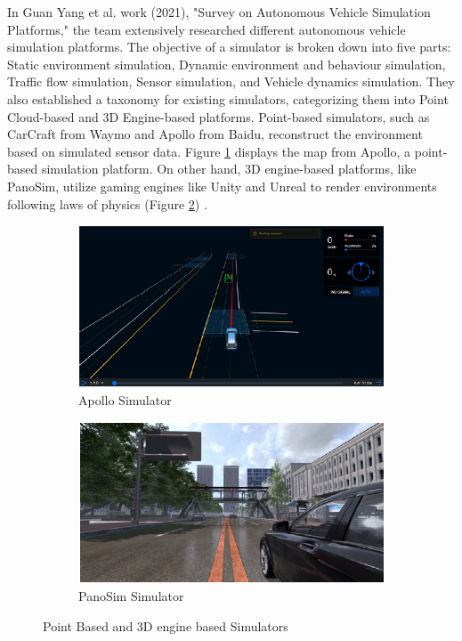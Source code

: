 \documentclass[12pt,twoside,a4paper,parskip]{scrbook} %
\begin{document}
In Guan Yang et al. work (2021), "Survey on Autonomous Vehicle Simulation Platforms," \cite{yangsurvey} the team extensively researched different autonomous vehicle simulation platforms. The objective of a simulator is broken down into five parts: Static environment simulation, Dynamic environment and behaviour simulation, Traffic flow simulation, Sensor simulation, and Vehicle dynamics simulation. They also established a taxonomy for existing simulators, categorizing them into Point Cloud-based and 3D Engine-based platforms. Point-based simulators, such as CarCraft from Waymo and Apollo from Baidu, reconstruct the environment based on simulated sensor data. Figure \ref{fig:apollo} displays the map from Apollo, a point-based simulation platform. On other hand, 3D engine-based platforms, like PanoSim, utilize gaming engines like Unity and Unreal to render environments following laws of physics (Figure \ref{fig:Panosim}) \cite{yangsurvey}.
\begin{figure}[H]
  \centering
  \begin{subfigure}{\textwidth}
    \centering
    \includegraphics[width=0.75\linewidth]{Images/Apollo_sim.png}
    \caption{Apollo Simulator}
    \label{fig:apollo}
  \end{subfigure}
  
  \vspace{1cm} %
  
  \begin{subfigure}{\textwidth}
    \centering
    \includegraphics[width=0.75\linewidth]{Images/Panosim.png} 
    \caption{PanoSim Simulator}
    \label{fig:Panosim}
  \end{subfigure}
  
  \caption{Point Based and 3D engine based Simulators}
  \label{fig:taxonomy_based_on_render}
\end{figure}
\end{document}
